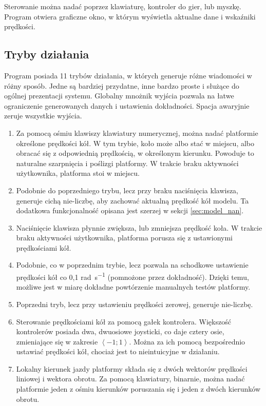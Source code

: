 	Sterowanie można nadać poprzez klawiaturę, kontroler do gier, lub myszkę.
	Program otwiera graficzne okno, w którym wyświetla aktualne dane i wskaźniki prędkości.
	
	\subsection{Tryby działania}
		Program posiada 11 trybów działania, w których generuje różne wiadomości w różny sposób.
		Jedne są bardziej przydatne, inne bardzo proste i służące do ogólnej prezentacji systemu.
		Globalny mnożnik wyjścia pozwala na łatwe ograniczenie generowanych danych i ustawienia dokładności. Spacja awaryjnie zeruje wszystkie wyjścia.
		\begin{enumerate}
			\item Za pomocą ośmiu klawiszy klawiatury numerycznej, można nadać platformie określone prędkości kół.
			W tym trybie, koło może albo stać w miejscu, albo obracać się z odpowiednią prędkością, w określonym kierunku. 
			Powoduje to naturalne szarpnięcia i poślizgi platformy. W trakcie braku aktywności użytkownika, platforma stoi w miejscu.
			\item Podobnie do poprzedniego trybu, lecz przy braku naciśnięcia klawisza, generuje cichą nie-liczbę, aby zachować aktualną prędkość kół modelu.
			Ta dodatkowa funkcjonalność opisana jest szerzej w sekcji \ref{sec:model_nan}.
			\item Naciśnięcie klawisza płynnie zwiększa, lub zmniejsza prędkość koła. W trakcie braku aktywności użytkownika, platforma porusza się 
			z ustawionymi prędkościami kół.
			\item Podobnie, co w poprzednim trybie, lecz pozwala na schodkowe ustawienie prędkości kół co 0,1 \si{\radian\per\second} (pomnożone przez dokładność).
			Dzięki temu, możliwe jest w miarę dokładne powtórzenie manualnych testów platformy.
			\item Poprzedni tryb, lecz przy ustawieniu prędkości zerowej, generuje nie-liczbę.
			\item Sterowanie prędkościami kół za pomocą gałek kontrolera.
			Większość kontrolerów posiada dwa, dwuosiowe joysticki, co daje cztery osie, zmieniające się w zakresie $\left<-1;1\right>$.
			Można za ich pomocą bezpośrednio ustawiać prędkości kół, chociaż jest to nieintuicyjne w działaniu.
			\item Lokalny kierunek jazdy platformy składa się z dwóch wektorów prędkości liniowej i wektora obrotu. 
			Za pomocą klawiatury, binarnie, można nadać platformie jeden z ośmiu kierunków poruszania się i jeden z dwóch kierunków obrotu.

\end{enumerate}
